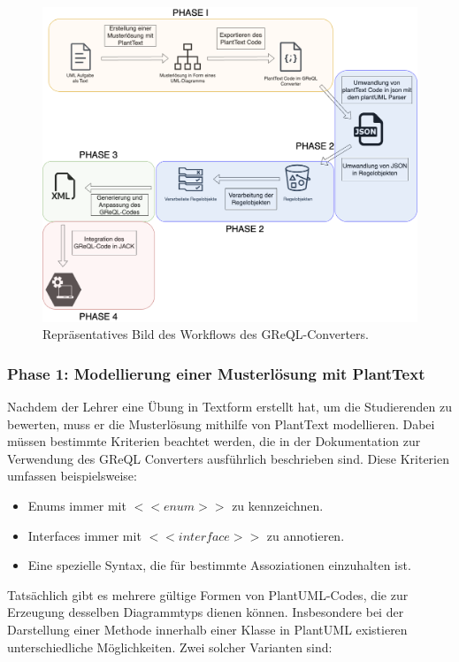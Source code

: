 \begin{figure}
    \centering
    \includegraphics[width=15cm]{images/workflow}
    \caption{Repräsentatives Bild des Workflows des GReQL-Converters.}
    \label{fig:workflow}
\end{figure}

\subsubsection{Phase 1: Modellierung einer Musterlösung mit PlantText}

Nachdem der Lehrer eine Übung in Textform erstellt hat, um die Studierenden zu bewerten, muss er die Musterlösung
mithilfe von PlantText modellieren. Dabei müssen bestimmte Kriterien beachtet werden, die in der Dokumentation zur 
Verwendung des \gls{GReQL Converter}s ausführlich beschrieben sind. Diese Kriterien umfassen beispielsweise:

\begin{itemize}
    \item Enums immer mit $<<enum>>$ zu kennzeichnen.
    \item Interfaces immer mit $<<interface>>$ zu annotieren.
    \item Eine spezielle Syntax, die für bestimmte Assoziationen einzuhalten ist.
\end{itemize}

Tatsächlich gibt es mehrere gültige Formen von PlantUML-Codes, die zur Erzeugung desselben Diagrammtyps dienen können.
Insbesondere bei der Darstellung einer Methode innerhalb einer Klasse in PlantUML existieren unterschiedliche
Möglichkeiten. Zwei solcher Varianten sind:

